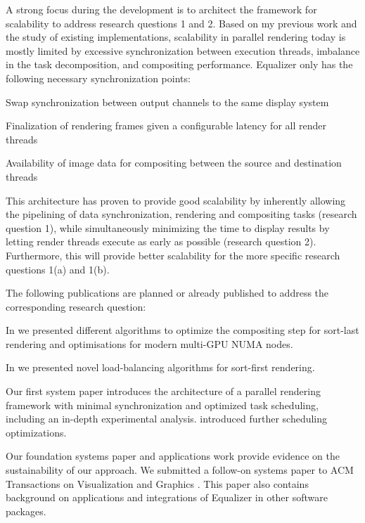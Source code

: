 A strong focus during the development is to architect the framework for
scalability to address research questions 1 and 2. Based on my previous work and
the study of existing implementations, scalability in parallel rendering today
is mostly limited by excessive synchronization between execution threads,
imbalance in the task decomposition, and compositing performance. Equalizer only
has the following necessary synchronization points:
%
\begin{compactenum}
\item Swap synchronization between output channels to the same display system
\item Finalization of rendering frames given a configurable latency for all render threads
\item Availability of image data for compositing between the source and destination threads
\end{compactenum}
%
This architecture has proven to provide good scalability by inherently allowing
the pipelining of data synchronization, rendering and compositing tasks
(research question 1), while simultaneously minimizing the time to display
results by letting render threads execute as early as possible (research
question 2). Furthermore, this will provide better scalability for the more
specific research questions 1(a) and 1(b).

The following publications are planned or already published to address the corresponding research question:
\begin{compactenum}
    \item
    \begin{compactenum}
        \item In \cite{EP:07, MEP:10, EBAHMP:12} we presented different algorithms to optimize the compositing step for sort-last rendering and optimisations for modern multi-GPU NUMA nodes.
        \item In \cite{EEP:11, SPEP:16} we presented novel load-balancing algorithms for sort-first rendering.
    \end{compactenum}
    \item Our first system paper \cite{EMP:09} introduces the architecture of a parallel rendering framework with minimal synchronization and optimized task scheduling, including an in-depth experimental analysis. \cite{EBAHMP:12} introduced further scheduling optimizations.
    \item Our foundation systems paper \cite{EMP:09} and applications work \cite{HBBES:13} provide evidence on the sustainability of our approach. We submitted a follow-on systems paper to ACM Transactions on Visualization and Graphics \cite{ESP:18}. This paper also contains background on applications and integrations of Equalizer in other software packages.
\end{compactenum}

